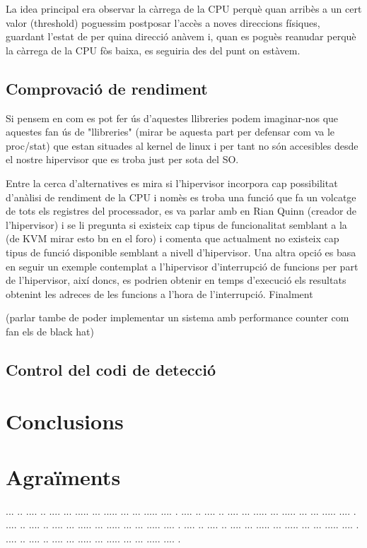 ﻿\documentclass[10pt,a4paper,twocolumn,twoside]{article}
\begin{document}
La idea principal era observar la càrrega de la CPU perquè quan arribès a un cert valor (threshold) poguessim postposar l’accès a noves direccions físiques, guardant l’estat de per quina direcció anàvem i, quan es poguès reanudar perquè la càrrega de la CPU fòs baixa, es seguiria des del punt on estàvem.
\subsection{Comprovació de rendiment}
Si pensem en com es pot fer ús d'aquestes llibreries podem imaginar-nos que aquestes fan ús de "llibreries" (mirar be aquesta part per defensar com va le proc/stat) que estan situades al kernel de linux i per tant no són accesibles desde el nostre hipervisor que es troba just per sota del SO.

Entre la cerca d'alternatives es mira si l'hipervisor incorpora cap possibilitat d'anàlisi de rendiment de la CPU i nomès es troba una funció que fa un volcatge de tots els registres del processador, es va parlar amb en Rian Quinn (creador de l'hipervisor) i se li pregunta si existeix cap tipus de funcionalitat semblant a la (de KVM mirar esto bn en el foro) i comenta que actualment no existeix cap tipus de funció disponible semblant a nivell d'hipervisor. Una altra opció es basa en seguir un exemple contemplat a l'hipervisor d'interrupció de funcions per part de l'hipervisor, així doncs, es podrien obtenir en temps d'execució els resultats obtenint les adreces de les funcions a l'hora de l'interrupció. Finalment 

 (parlar tambe de poder implementar un sistema amb performance counter com fan els de black hat)
\subsection{Control del codi de detecció}



\section{Conclusions}




\section*{Agraïments}

... ..  .... .. .... ... ..... ... ..... ... ... ..... .... .
.... ..  .... .. .... ... ..... ... ..... ... ... ..... .... .
.... ..  .... .. .... ... ..... ... ..... ... ... ..... .... .
.... ..  .... .. .... ... ..... ... ..... ... ... ..... .... .
.... ..  .... .. .... ... ..... ... ..... ... ... ..... .... .
\end{document}
